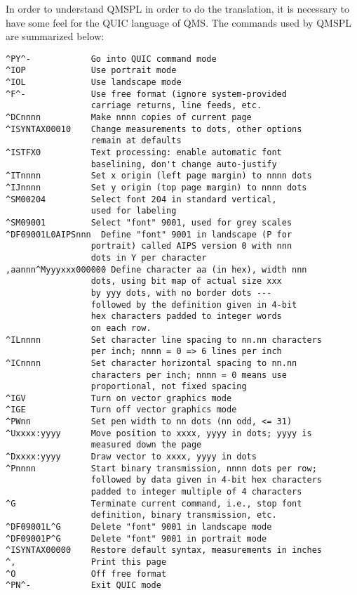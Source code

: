 In order to understand QMSPL in order to do the translation, it is
necessary to have some feel for the QUIC language of QMS.  The
commands used by QMSPL are summarized below:
\begin{verbatim}
^PY^-            Go into QUIC command mode
^IOP             Use portrait mode
^IOL             Use landscape mode
^F^-             Use free format (ignore system-provided
                 carriage returns, line feeds, etc.
^DCnnnn          Make nnnn copies of current page
^ISYNTAX00010    Change measurements to dots, other options
                 remain at defaults
^ISTFX0          Text processing: enable automatic font
                 baselining, don't change auto-justify
^ITnnnn          Set x origin (left page margin) to nnnn dots
^IJnnnn          Set y origin (top page margin) to nnnn dots
^SM00204         Select font 204 in standard vertical,
                 used for labeling
^SM09001         Select "font" 9001, used for grey scales
^DF09001L0AIPSnnn  Define "font" 9001 in landscape (P for
                 portrait) called AIPS version 0 with nnn
                 dots in Y per character
,aannn^Myyyxxx000000 Define character aa (in hex), width nnn
                 dots, using bit map of actual size xxx
                 by yyy dots, with no border dots ---
                 followed by the definition given in 4-bit
                 hex characters padded to integer words
                 on each row.
^ILnnnn          Set character line spacing to nn.nn characters
                 per inch; nnnn = 0 => 6 lines per inch
^ICnnnn          Set character horizontal spacing to nn.nn
                 characters per inch; nnnn = 0 means use
                 proportional, not fixed spacing
^IGV             Turn on vector graphics mode
^IGE             Turn off vector graphics mode
^PWnn            Set pen width to nn dots (nn odd, <= 31)
^Uxxxx:yyyy      Move position to xxxx, yyyy in dots; yyyy is
                 measured down the page
^Dxxxx:yyyy      Draw vector to xxxx, yyyy in dots
^Pnnnn           Start binary transmission, nnnn dots per row;
                 followed by data given in 4-bit hex characters
                 padded to integer multiple of 4 characters
^G               Terminate current command, i.e., stop font
                 definition, binary transmission, etc.
^DF09001L^G      Delete "font" 9001 in landscape mode
^DF09001P^G      Delete "font" 9001 in portrait mode
^ISYNTAX00000    Restore default syntax, measurements in inches
^,               Print this page
^O               Off free format
^PN^-            Exit QUIC mode

\end{verbatim}

